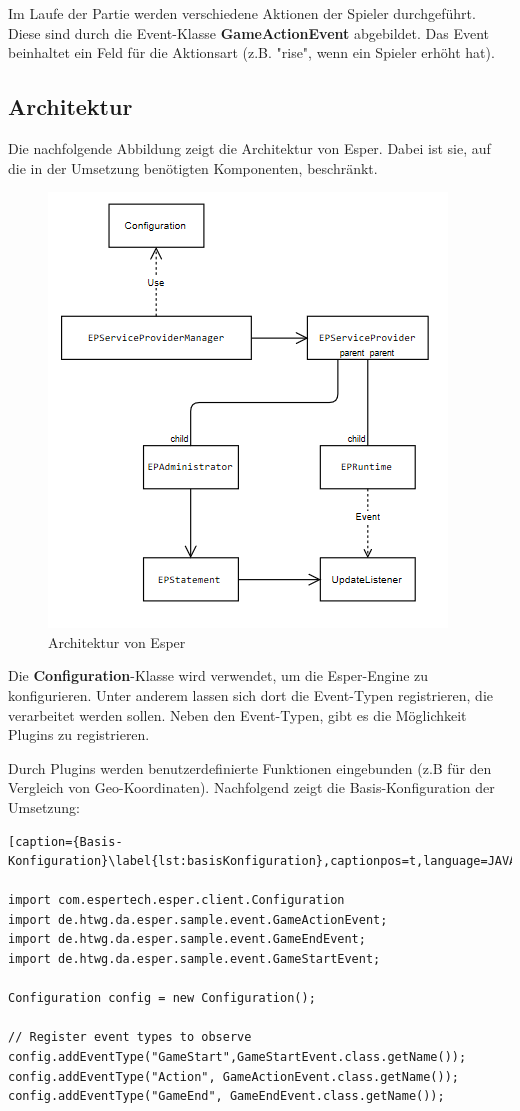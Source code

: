 Im Laufe der Partie werden verschiedene Aktionen der Spieler durchgeführt. Diese sind durch die Event-Klasse \textbf{GameActionEvent} abgebildet. Das Event beinhaltet ein Feld für die Aktionsart (z.B. "rise", wenn ein Spieler erhöht hat).

\subsection{Architektur}
\label{kapitel_architektur}
Die nachfolgende Abbildung zeigt die Architektur von Esper. Dabei ist sie, auf die in der Umsetzung benötigten Komponenten, beschränkt.

\begin{figure}[ht]
	\centering
	\includegraphics{images/Architektur.png}
	\caption{Architektur von Esper}
	\label{architektur}
\end{figure}

Die \textbf{Configuration}-Klasse wird verwendet, um die Esper-Engine zu konfigurieren. Unter anderem lassen sich dort die Event-Typen registrieren, die verarbeitet werden sollen. Neben den Event-Typen, gibt es die Möglichkeit Plugins zu registrieren. 

Durch Plugins werden benutzerdefinierte Funktionen eingebunden (z.B für den Vergleich von Geo-Koordinaten).
Nachfolgend zeigt die Basis-Konfiguration der Umsetzung:

\begin{lstlisting}[caption={Basis-Konfiguration}\label{lst:basisKonfiguration},captionpos=t,language=JAVA]

import com.espertech.esper.client.Configuration
import de.htwg.da.esper.sample.event.GameActionEvent;
import de.htwg.da.esper.sample.event.GameEndEvent;
import de.htwg.da.esper.sample.event.GameStartEvent;

Configuration config = new Configuration();

// Register event types to observe
config.addEventType("GameStart",GameStartEvent.class.getName());
config.addEventType("Action", GameActionEvent.class.getName());
config.addEventType("GameEnd", GameEndEvent.class.getName());
\end{lstlisting}


